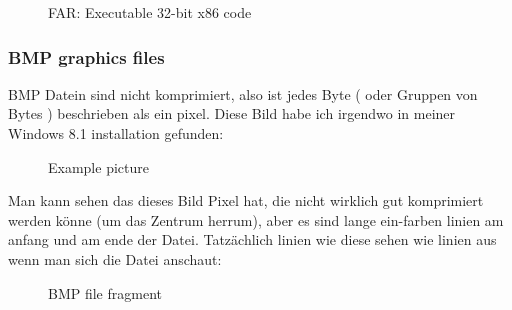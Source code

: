 \begin{figure}[H]
\centering
{}
\caption{FAR: Executable 32-bit x86 code}
\end{figure}


\clearpage
\subsubsection{BMP graphics files}


BMP Datein sind nicht komprimiert, also ist jedes Byte ( oder Gruppen von Bytes ) beschrieben als
ein pixel. Diese Bild habe ich irgendwo in meiner Windows 8.1 installation gefunden: 


\begin{figure}[H]
\centering
{}
\caption{Example picture}
\end{figure}

Man kann sehen das dieses Bild Pixel hat, die nicht wirklich gut komprimiert werden könne (um das Zentrum herrum),
aber es sind lange ein-farben linien am anfang und am ende der Datei. Tatzächlich linien wie diese sehen wie linien aus
wenn man sich die Datei anschaut:


\begin{figure}[H]
\centering
{}
\caption{BMP file fragment}
\end{figure}

